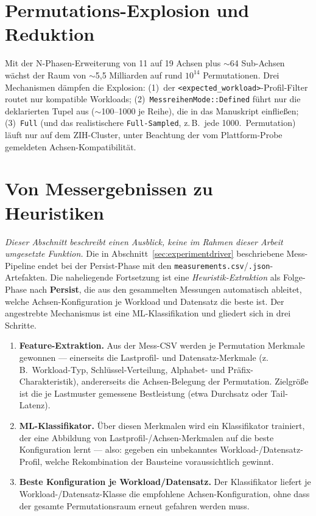 \section{Permutations-Explosion und Reduktion}\label{sec:explosion}

Mit der N-Phasen-Erweiterung von 11 auf 19 Achsen plus $\sim$64 Sub-Achsen wächst der Raum von
$\sim$5,5 Milliarden auf rund $10^{14}$ Permutationen. Drei Mechanismen dämpfen die
Explosion: (1)~der \texttt{<expected\_workload>}-Profil-Filter routet nur kompatible Workloads;
(2)~\texttt{MessreihenMode::Defined} führt nur die deklarierten Tupel aus ($\sim$100--1000 je
Reihe), die in das Manuskript einfließen; (3)~\texttt{Full} (und das realistischere
\texttt{Full-Sampled}, z.\,B.\ jede 1000.\ Permutation) läuft nur auf dem ZIH-Cluster, unter
Beachtung der vom Plattform-Probe gemeldeten Achsen-Kompatibilität.

\section{Von Messergebnissen zu Heuristiken}\label{sec:measurements-to-heuristics}

\emph{Dieser Abschnitt beschreibt einen Ausblick, keine im Rahmen dieser Arbeit umgesetzte Funktion.}
Die in Abschnitt~\ref{sec:experimentdriver} beschriebene Mess-Pipeline endet bei der Persist-Phase
mit den \texttt{measurements.csv}/\texttt{.json}-Artefakten. Die naheliegende Fortsetzung ist eine
\emph{Heuristik-Extraktion} als Folge-Phase nach \textbf{Persist}, die aus den gesammelten Messungen
automatisch ableitet, welche Achsen-Konfiguration je Workload und Datensatz die beste ist. Der
angestrebte Mechanismus ist eine ML-Klassifikation und gliedert sich in drei Schritte.

\begin{enumerate}
  \item \textbf{Feature-Extraktion.} Aus der Mess-CSV werden je Permutation Merkmale gewonnen ---
  einerseits die Lastprofil- und Datensatz-Merkmale (z.\,B.\ Workload-Typ, Schlüssel-Verteilung,
  Alphabet- und Präfix-Charakteristik), andererseits die Achsen-Belegung der Permutation. Zielgröße
  ist die je Lastmuster gemessene Bestleistung (etwa Durchsatz oder Tail-Latenz).
  \item \textbf{ML-Klassifikator.} Über diesen Merkmalen wird ein Klassifikator trainiert, der eine
  Abbildung von Lastprofil-/Achsen-Merkmalen auf die beste Konfiguration lernt --- also: gegeben ein
  unbekanntes Workload-/Datensatz-Profil, welche Rekombination der Bausteine voraussichtlich
  gewinnt.
  \item \textbf{Beste Konfiguration je Workload/Datensatz.} Der Klassifikator liefert je
  Workload-/Datensatz-Klasse die empfohlene Achsen-Konfiguration, ohne dass der gesamte
  Permutationsraum erneut gefahren werden muss.
\end{enumerate}


